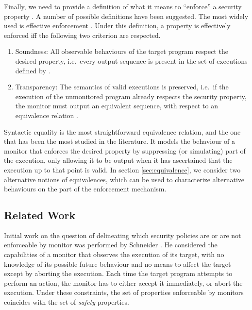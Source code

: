 \documentclass[12pt]{article}
\begin{document}
Finally, we need to provide a definition of what it means to ``enforce'' a security property \Property.  A number of possible definitions have been suggested. The most widely used is effective enforcement \cite{MoreEnforce}. Under this definition, a property is effectively enforced iff the following two criterion are respected.
\begin{enumerate}
  \item Soundness: All observable behaviours of the target program respect the desired property, i.e.\ every output sequence is present in the set of executions defined by \Property.
  \item Transparency: The semantics of valid executions is preserved, i.e.\ if the execution of the unmonitored program already respects the security property, the monitor must output  an equivalent sequence, with respect to an equivalence relation .
\end{enumerate}

Syntactic equality is the most straightforward equivalence relation, and the one that has been the most studied in the literature.  It models the behaviour of a monitor that enforces the desired property by suppressing (or simulating) part of the execution, only allowing it to be output  when it has ascertained that the execution up to that point is valid. In section \ref{sec:equivalence}, we consider two alternative notions of equivalences, which can be used to characterize alternative behaviours on the part of the enforcement mechanism.
\subsection{Related Work}\label{sec:related}

Initial work on the question of delineating which security policies are or are not enforceable by monitor was performed by Schneider \cite{enforceable}. He considered the capabilities of a monitor that observes the execution of its target, with no knowledge of its possible future behaviour and no means to affect the target except by aborting the execution. Each time the target program attempts to perform an action, the monitor has to either accept it immediately, or abort the execution. Under these constraints, the set of properties enforceable by monitors coincides with the set of \textit{safety} properties.
\end{document}
